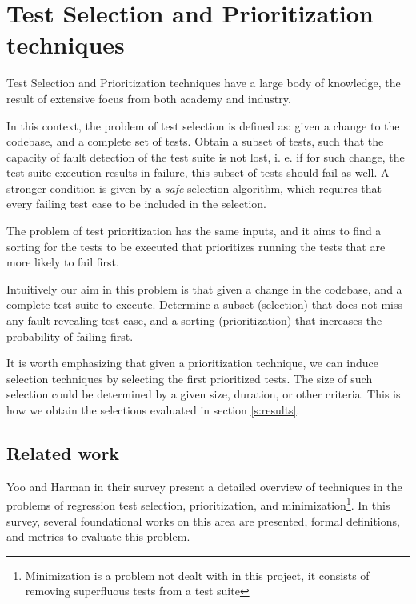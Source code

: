 \section{Test Selection and Prioritization techniques}\label{s:tsp-tech}

Test Selection and Prioritization techniques have a large body of knowledge,
the result of extensive focus from both academy and industry.

In this context, the problem of test selection is defined as: given a change
to the codebase, and a complete set of tests. Obtain a subset of tests,
such that the capacity of fault detection of the test suite is not lost, i. e.
if for such change, the test suite execution results in failure, this subset
of tests should fail as well. A stronger condition is given by a \emph{safe} 
selection algorithm, which requires that every failing test case to be included in the selection.

The problem of test prioritization has the same inputs, and it aims to find a
sorting for the tests to be executed that prioritizes running the tests that
are more likely to fail first.

Intuitively our aim in this problem is that given a change in the codebase,
and a complete test suite to execute. Determine a subset (selection) that
does not miss any fault-revealing test case, and a sorting (prioritization)
that increases the probability of failing first.

It is worth emphasizing that given a prioritization technique, we can induce
selection techniques by selecting the first prioritized tests. The size of
such selection could be determined by a given size, duration, or other criteria.
This is how we obtain the selections evaluated in section \ref{s:results}.

\subsection{Related work}
\label{sec:bg-tsp-related-work}

Yoo and Harman in their survey \cite{Yoo2012RegressionTM} present a detailed overview of techniques in the problems of
regression test selection, prioritization, and minimization\footnote{Minimization is a problem not dealt with in this project, it consists of removing superfluous tests from a test suite}.
 In this survey, several foundational works on this area are presented, formal definitions, and metrics to evaluate this problem.

